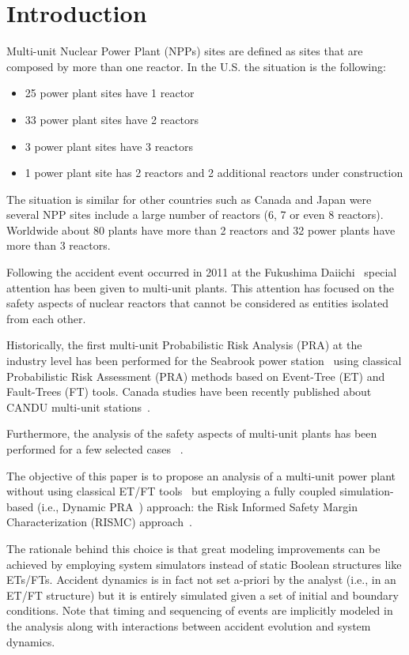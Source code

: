 \section{Introduction}
\label{sec:introduction}

Multi-unit Nuclear Power Plant (NPPs) sites are defined as sites that are composed by 
more than one reactor. In the U.S. the situation is the following:
\begin{itemize}
  \item 25 power plant sites have 1 reactor
  \item 33 power plant sites have 2 reactors
  \item 3 power plant sites have 3 reactors
  \item 1 power plant site has 2 reactors and 2 additional reactors under construction
\end{itemize}
The situation is similar for other countries such as Canada and Japan were 
several NPP sites include a large number of reactors (6, 7 or even 8 reactors). 
Worldwide about 80 plants have more than 2 reactors and 32 power plants have more 
than 3 reactors. 

Following the accident event occurred in 2011 at the Fukushima Daiichi~\cite{Fukushima} special 
attention has been given to multi-unit plants. This attention has focused on the 
safety aspects of nuclear reactors that cannot be considered as entities isolated 
from each other. 

Historically, the first multi-unit Probabilistic Risk Analysis (PRA) at the industry
level has been performed for the Seabrook power station~\cite{Seabrook_MU_PRA} using 
classical Probabilistic Risk Assessment (PRA) methods based on Event-Tree (ET) and 
Fault-Trees (FT) tools.
Canada studies have been recently published about CANDU multi-unit 
stations~\cite{CANDU_MU_PRA,Darlington_MU_PRA}.

Furthermore, the analysis of the safety aspects of multi-unit plants has been performed 
for a few selected cases ~\cite{MultiUnitKumara,MultiUnitModarres,MultiUnitZhang}. 

The objective of this paper is to propose an analysis of a multi-unit power 
plant without using classical ET/FT tools~\cite{Nureg1150} but employing a fully 
coupled simulation-based (i.e., Dynamic PRA~\cite{DynamicReliabilityMonteCarlo}) approach: 
the Risk Informed Safety Margin Characterization (RISMC) approach~\cite{RISMC,mandelliNewAlgo}. 

The rationale behind this choice is that great modeling improvements can be achieved by 
employing system simulators instead of static Boolean structures like ETs/FTs. 
Accident dynamics is in fact not set a-priori by the analyst (i.e., in an ET/FT 
structure) but it is entirely simulated given a set of initial and boundary conditions. 
Note that timing and sequencing of events are implicitly modeled in the analysis along 
with interactions between accident evolution and system dynamics.

